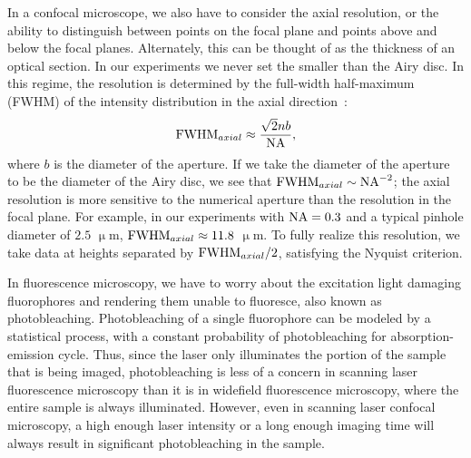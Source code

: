 In a confocal microscope, we also have to consider the axial resolution, or the ability to distinguish between points on the focal plane and points above and below the focal planes.
Alternately, this can be thought of as the thickness of an optical section.
In our experiments we never set the smaller than the Airy disc.
In this regime, the resolution is determined by the full-width half-maximum (FWHM) of the intensity distribution in the axial direction~\cite{RN315}:
\begin{equation}
  {\rm FWHM}_{axial} \approx \frac{\sqrt{2} n b}{{\rm NA}},
\end{equation}
where $b$ is the diameter of the aperture.
If we take the diameter of the aperture to be the diameter of the Airy disc, we see that ${\rm FWHM}_{axial} \sim {\rm NA}^{-2}$; the axial resolution is more sensitive to the numerical aperture than the resolution in the focal plane.
For example, in our experiments with ${\rm NA} = 0.3$ and a typical pinhole diameter of $2.5$ $\upmu$m, ${\rm FWHM}_{axial} \approx 11.8$ $\upmu$m.
To fully realize this resolution, we take data at heights separated by ${\rm FWHM}_{axial}/2$, satisfying the Nyquist criterion.

In fluorescence microscopy, we have to worry about the excitation light damaging fluorophores and rendering them unable to fluoresce, also known as photobleaching.
Photobleaching of a single fluorophore can be modeled by a statistical process, with a constant probability of photobleaching for absorption-emission cycle.
Thus, since the laser only illuminates the portion of the sample that is being imaged, photobleaching is less of a concern in scanning laser fluorescence microscopy than it is in widefield fluorescence microscopy, where the entire sample is always illuminated.
However, even in scanning laser confocal microscopy, a high enough laser intensity or a long enough imaging time will always result in significant photobleaching in the sample.

